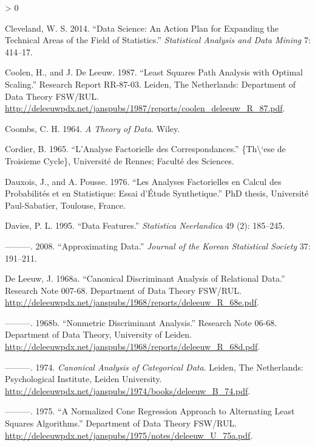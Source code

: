 \documentclass[
  12pt,
]{book}
\newlength{\cslhangindent}
\newenvironment{CSLReferences}[2] %
 {%
  \setlength{\parindent}{0pt}
  \ifodd #1 \everypar{\setlength{\hangindent}{\cslhangindent}}\ignorespaces\fi
  \ifnum #2 > 0
  \setlength{\parskip}{#2\baselineskip}
  \fi
 }%
 {}
\begin{document}
\begin{CSLReferences}{1}{0}
\leavevmode\hypertarget{ref-cleveland_14}{}%
Cleveland, W. S. 2014. {``{Data Science: An Action Plan for Expanding the Technical Areas of the Field of Statistics}.''} \emph{Statistical Analysis and Data Mining} 7: 414--17.

\leavevmode\hypertarget{ref-coolen_deleeuw_R_87}{}%
Coolen, H., and J. De Leeuw. 1987. {``{Least Squares Path Analysis with Optimal Scaling}.''} Research Report RR-87-03. Leiden, The Netherlands: Department of Data Theory FSW/RUL. \url{http://deleeuwpdx.net/janspubs/1987/reports/coolen_deleeuw_R_87.pdf}.

\leavevmode\hypertarget{ref-coombs_64}{}%
Coombs, C. H. 1964. \emph{{A Theory of Data}}. Wiley.

\leavevmode\hypertarget{ref-cordier_65}{}%
Cordier, B. 1965. {``{L'Analyse Factorielle des Correspondances}.''} \{Th\textbackslash`ese de Troisieme Cycle\}, Université de Rennes; Faculté des Sciences.

\leavevmode\hypertarget{ref-dauxois_pousse_76}{}%
Dauxois, J., and A. Pousse. 1976. {``{Les Analyses Factorielles en Calcul des Probabilités et en Statistique: Essai d'Étude Synthetique}.''} PhD thesis, Université Paul-Sabatier, Toulouse, France.

\leavevmode\hypertarget{ref-davies_95}{}%
Davies, P. L. 1995. {``{Data Features}.''} \emph{Statistica Neerlandica} 49 (2): 185--245.

\leavevmode\hypertarget{ref-davies_08}{}%
---------. 2008. {``{Approximating Data}.''} \emph{Journal of the Korean Statistical Society} 37: 191--211.

\leavevmode\hypertarget{ref-deleeuw_R_68e}{}%
De Leeuw, J. 1968a. {``Canonical Discriminant Analysis of Relational Data.''} Research Note 007-68. Department of Data Theory FSW/RUL. \url{http://deleeuwpdx.net/janspubs/1968/reports/deleeuw_R_68e.pdf}.

\leavevmode\hypertarget{ref-deleeuw_R_68d}{}%
---------. 1968b. {``Nonmetric Discriminant Analysis.''} Research Note 06-68. Department of Data Theory, University of Leiden. \url{http://deleeuwpdx.net/janspubs/1968/reports/deleeuw_R_68d.pdf}.

\leavevmode\hypertarget{ref-deleeuw_B_74}{}%
---------. 1974. \emph{Canonical Analysis of Categorical Data}. Leiden, The Netherlands: Psychological Institute, Leiden University. \url{http://deleeuwpdx.net/janspubs/1974/books/deleeuw_B_74.pdf}.

\leavevmode\hypertarget{ref-deleeuw_U_75a}{}%
---------. 1975. {``{A Normalized Cone Regression Approach to Alternating Least Squares Algorithms}.''} Department of Data Theory FSW/RUL. \url{http://deleeuwpdx.net/janspubs/1975/notes/deleeuw_U_75a.pdf}.


\end{CSLReferences}
\end{document}
